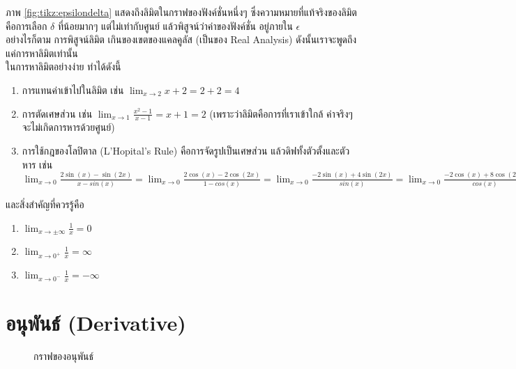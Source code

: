 \documentclass[12pt, a4paper, oneside]{article}
\begin{document}
ภาพ \ref{fig:tikz:epsilondelta} แสดงถึงลิมิตในกราฟของฟังค์ชั่นหนึ่งๆ ซึ่งความหมายที่แท้จริงของลิมิต คือการเลือก $\delta$ ที่น้อยมากๆ แต่ไม่เท่ากับศูนย์ แล้วพิสูจน์ว่าค่าของฟังค์ชั่น อยู่ภายใน $\epsilon$ \\
อย่างไรก็ตาม การพิสูจน์ลิมิต เกินของเขตของแคลคูลัส (เป็นของ Real Analysis) ดังนั้นเราจะพูดถึงแค่การหาลิมิตเท่านั้น \\
ในการหาลิมิตอย่างง่าย ทำได้ดังนี้
\begin{enumerate}
    \item การแทนค่าเข้าไปในลิมิต เช่น $\lim_{x\to2} x+2 = 2+2 = 4$
    \item การตัดเศษส่วน เช่น $\lim_{x\to1}\frac{x^2-1}{x-1} = x+1 = 2$ (เพราะว่าลิมิตคือการที่เราเข้าใกล้ ค่าจริงๆ จะไม่เกิดการหารด้วยศูนย์)
    \item การใช้กฎของโลปิตาล (L'Hopital's Rule) คือการจัดรูปเป็นเศษส่วน แล้วดิฟทั้งตัวตั้งและตัวหาร เช่น $\lim_{x\to0}\frac{2\sin(x)-\sin(2x)}{x-sin(x)} = \lim_{x\to0}\frac{2\cos(x)-2\cos(2x)}{1-cos(x)} = \lim_{x\to0}\frac{-2\sin(x)+4\sin(2x)}{sin(x)} = \lim_{x\to0}\frac{-2\cos(x)+8\cos(2x)}{cos(x)} = \frac{-2+8}{1} = 6$
\end{enumerate}
และสิ่งสำคัญที่ควรรู้คือ
\begin{enumerate}
    \item $\lim_{x\to\pm\infty} \frac{1}{x} = 0$
    \item $\lim_{x\to0^+} \frac{1}{x} = \infty$
    \item $\lim_{x\to0^-} \frac{1}{x} = -\infty$
\end{enumerate}

\section{อนุพันธ์ (Derivative)}
\begin{figure}[!htb]
    \centering
    
    \caption{กราฟของอนุพันธ์}
    \label{fig:tikz:derivative}
\end{figure}
\end{document}
